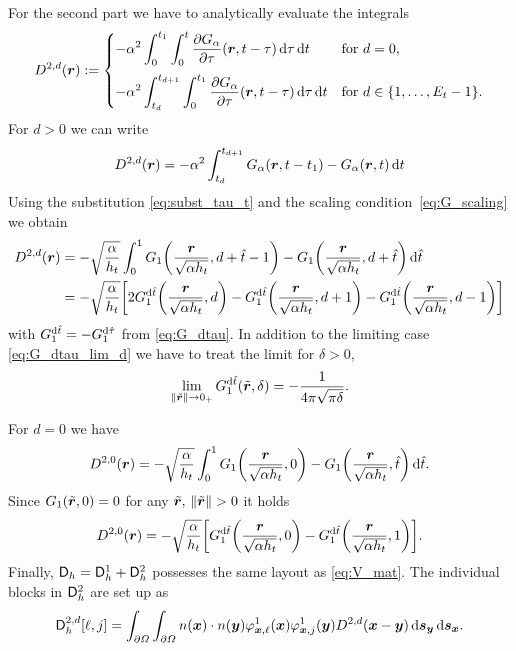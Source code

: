 \documentclass[a4paper,11pt]{article}
\begin{document}
For the second part we have to analytically evaluate the integrals
\begin{equation*}
  D^{2,d}({{\bm{r}}}) := 
  \begin{cases}
  \displaystyle
    -\alpha^2 \int_{0}^{t_1} \int_{0}^{t} \frac{\partial G_\alpha}{\partial \tau}({{\bm{r}}},t-\tau) \,{\mathrm{d}}\tau \,{\mathrm{d}} t & \text{for } d = 0, \\[4mm]
  \displaystyle
    -\alpha^2 \int_{t_d}^{t_{d+1}} \int_{0}^{t_1} \frac{\partial G_\alpha}{\partial \tau}({{\bm{r}}},t-\tau) \,{\mathrm{d}}\tau \,{\mathrm{d}} t & \text{for } d \in \{1,\ldots,E_t-1\}.
  \end{cases}
\end{equation*}
For $d>0$ we can write
\begin{equation*}
  D^{2,d}({{\bm{r}}}) = -\alpha^2 \int_{t_d}^{t_{d+1}} G_\alpha({{\bm{r}}},t-t_1) - G_\alpha({{\bm{r}}},t) \,{\mathrm{d}} t
\end{equation*}
Using the substitution \eqref{eq:subst_tau_t} and the scaling condition~\eqref{eq:G_scaling} we obtain
\begin{align*}
  D^{2,d}({{\bm{r}}}) &= -\sqrt{\frac{\alpha}{h_t}} \int_0^1 G_1\bigg(\frac{{{\bm{r}}}}{\sqrt{\alpha h_t}},d+\hat t-1\bigg) - G_1\bigg(\frac{{{\bm{r}}}}{\sqrt{\alpha h_t}},d + \hat t\bigg) \,{\mathrm{d}} \hat t \\
  &= -\sqrt{\frac{\alpha}{h_t}} \bigg[ 2G_1^{{\mathrm{d}}\hat t}\bigg( \frac{{{\bm{r}}}}{\sqrt{\alpha h_t}}, d \bigg) - G_1^{{\mathrm{d}}\hat t}\bigg( \frac{{{\bm{r}}}}{\sqrt{\alpha h_t}}, d + 1 \bigg) - G_1^{{\mathrm{d}}\hat t}\bigg( \frac{{{\bm{r}}}}{\sqrt{\alpha h_t}}, d - 1 \bigg) \bigg]
\end{align*}
with $G_1^{{\mathrm{d}}\hat t} = -G_1^{{\mathrm{d}}\hat \tau}$ from \eqref{eq:G_dtau}. In addition to the limiting case \eqref{eq:G_dtau_lim_d} we have to treat the limit for $\delta>0$,
\begin{equation*}
  \lim_{\|\tilde {{{\bm{r}}}}\| \to 0_+} G^{{\mathrm{d}}\hat t}_1(\tilde {{{\bm{r}}}},\delta) = -\frac{1}{4\pi\sqrt{\pi\delta}}.
\end{equation*}

For $d=0$ we have
\begin{equation*}
  D^{2,0}({{\bm{r}}}) = -\sqrt{\frac{\alpha}{h_t}} \int_0^1 G_1\bigg(\frac{{{\bm{r}}}}{\sqrt{\alpha h_t}},0\bigg) - G_1\bigg(\frac{{{\bm{r}}}}{\sqrt{\alpha h_t}},\hat t\bigg) \,{\mathrm{d}} \hat t.
\end{equation*}
Since $G_1(\tilde {{{\bm{r}}}},0) = 0$ for any $\tilde \vr,\,\|\tilde \vr\|>0$ it holds
\begin{equation*}
  D^{2,0}({{\bm{r}}}) = -\sqrt{\frac{\alpha}{h_t}}\bigg[ G_1^{{\mathrm{d}}\hat t}\bigg( \frac{{{\bm{r}}}}{\sqrt{\alpha h_t}}, 0 \bigg) - G_1^{{\mathrm{d}}\hat t}\bigg( \frac{{{\bm{r}}}}{\sqrt{\alpha h_t}}, 1 \bigg) \bigg].
\end{equation*}
Finally, ${{\mathsf{D}}}_h = {{\mathsf{D}}}_h^1 + {{\mathsf{D}}}_h^2$ possesses the same layout as \eqref{eq:V_mat}. The individual blocks in ${{\mathsf{D}}}_h^2$ are set up as
\begin{equation*}
  {\ensuremath{{\mathsf{D}}}}^{2,d}_h[ \ell , j ] = \int_{\partial\Omega} \int_{\partial\Omega} n({{\bm{x}}}) \cdot n({{\bm{y}}}) \varphi^1_{{{\bm{x}}},\ell}({{\bm{x}}}) \varphi^1_{{{\bm{x}}},j}({{\bm{y}}}) D^{2,d}({{\bm{x}}}-{{\bm{y}}}) \,{\mathrm{d}}{{\bm{s}}}_{{\bm{y}}} \,{\mathrm{d}}{{\bm{s}}}_{{\bm{x}}}.
\end{equation*}
\end{document}
